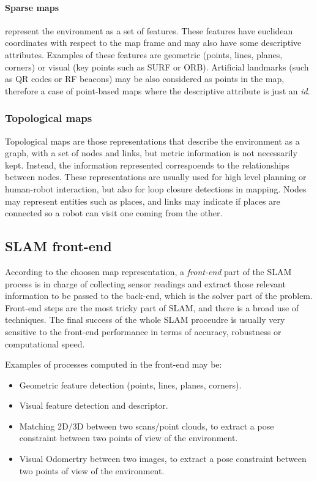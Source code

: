 \paragraph{Sparse maps} represent the environment as a set of features. These features have euclidean coordinates with respect to the map frame and may also have some descriptive attributes. Examples of these features are geometric (points, lines, planes, corners) or visual (key points such as SURF or ORB). Artificial landmarks (such as QR codes or RF beacons) may be also considered as points in the map, therefore a case of point-based maps where the descriptive attribute is just an \textit{id}. 

\subsubsection{Topological maps} 
Topological maps are those representations that describe the environment as a graph, with a set of nodes and links, but metric information is not necessarily kept. Instead, the information represented correspoends to the relationships between nodes. These representations are usually used for high level planning or human-robot interaction, but also for loop closure detections in mapping. Nodes may represent entities such as places, and links may indicate if places are connected so a robot can visit one coming from the other. 


\subsection{SLAM front-end}
According to the choosen map representation, a \textit{front-end} part of the SLAM process is in charge of collecting sensor readings and extract those relevant information to be passed to the back-end, which is the solver part of the problem. Front-end steps are the most tricky part of SLAM, and there is a broad use of techniques. The final success of the whole SLAM  proceudre is usually very sensitive to the front-end performance in terms of accuracy, robustness or computational speed.  


Examples of processes computed in the front-end may be: 
\begin{itemize}
 \item Geometric feature detection (points, lines, planes, corners).
 \item Visual feature detection and descriptor.
 \item Matching 2D/3D between two scans/point clouds, to extract a pose constraint between two points of view of the environment. 
 \item Visual Odomertry between two images, to extract a pose constraint between two points of view of the environment. 
\end{itemize}

